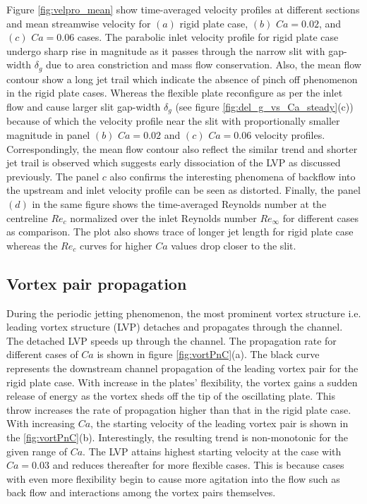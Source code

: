 \documentclass[final,3p,10pt,times,review,authoryear]{elsarticle}
\begin{document}
	Figure \ref{fig:velpro_mean} show time-averaged velocity profiles at different sections and mean streamwise velocity for $(a)$ rigid plate case, $(b)$ $Ca=0.02$, and $(c)$ $Ca=0.06$ cases. The parabolic inlet velocity profile for rigid plate case undergo sharp rise in magnitude as it passes through the narrow slit with gap-width $\delta_g$ due to area constriction and mass flow conservation. Also, the mean flow contour show a long jet trail which indicate the absence of pinch off phenomenon in the rigid plate cases. Whereas the flexible plate reconfigure as per the inlet flow and cause larger slit gap-width $\delta_g$ (see figure \ref{fig:del_g_vs_Ca_steady}(c)) because of which the velocity profile near the slit with proportionally smaller magnitude in panel $(b)$ $Ca=0.02$ and $(c)$ $Ca=0.06$ velocity profiles. Correspondingly, the mean flow contour also reflect the similar trend and shorter jet trail is observed which suggests early dissociation of the LVP as discussed previously. The panel $c$ also confirms the interesting phenomena of backflow into the upstream and inlet velocity profile can be seen as distorted. Finally, the panel $(d)$ in the same figure shows the time-averaged Reynolds number at the centreline $Re_c$ normalized over the inlet Reynolds number $Re_\infty$ for different cases as comparison. The plot also shows trace of longer jet length for rigid plate case whereas the $Re_c$ curves for higher $Ca$ values drop closer to the slit.
	
	\subsection{Vortex pair propagation}\label{sec:vortex}
	During the periodic jetting phenomenon, the most prominent vortex structure i.e. leading vortex structure (LVP) detaches and propagates through the channel. The detached LVP speeds up through the channel. The propagation rate for different cases of $Ca$ is shown in figure \ref{fig:vortPnC}(a). The black curve represents the downstream channel propagation of the leading vortex pair for the rigid plate case. With increase in the plates' flexibility, the vortex gains a sudden release of energy as the vortex sheds off the tip of the oscillating plate. This throw increases the rate of propagation higher than that in the rigid plate case. With increasing $Ca$, the starting velocity of the leading vortex pair is shown in the \ref{fig:vortPnC}(b). Interestingly, the resulting trend is non-monotonic for the given range of $Ca$. The LVP attains highest starting velocity at the case with $Ca=0.03$ and reduces thereafter for more flexible cases. This is because cases with even more flexibility begin to cause more agitation into the flow such as back flow and interactions among the vortex pairs themselves. 
	
\end{document}
